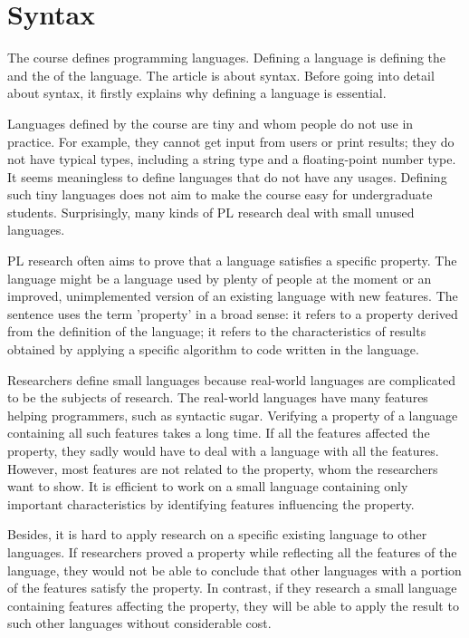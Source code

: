 \setchapterpreamble[u]{\margintoc}
\chapter{Syntax}

The course defines programming languages. Defining a language is defining the
 and the  of the language. The article is about
syntax. Before going into detail about syntax, it firstly explains why defining a
language is essential.

Languages defined by the course are tiny and whom people do not use in practice.
For example, they cannot get input from users or print results; they do not have
typical types, including a string type and a floating-point number type. It seems
meaningless to define languages that do not have any usages. Defining such tiny
languages does not aim to make the course easy for undergraduate students.
Surprisingly, many kinds of PL research deal with small unused languages.

PL research often aims to prove that a language satisfies a specific property.
The language might be a language used by plenty of people at the moment or an
improved, unimplemented version of an existing language with new features. The
sentence uses the term 'property' in a broad sense: it refers to a property
derived from the definition of the language; it refers to the characteristics of
results obtained by applying a specific algorithm to code written in the
language.

Researchers define small languages because real-world languages are complicated
to be the subjects of research. The real-world languages have many features
helping programmers, such as syntactic sugar. Verifying a property of a language
containing all such features takes a long time. If all the features affected the
property, they sadly would have to deal with a language with all the features.
However, most features are not related to the property, whom the researchers want
to show. It is efficient to work on a small language containing only important
characteristics by identifying features influencing the property.

Besides, it is hard to apply research on a specific existing language to other
languages. If researchers proved a property while reflecting all the features of
the language, they would not be able to conclude that other languages with a
portion of the features satisfy the property. In contrast, if they research a
small language containing features affecting the property, they will be able to
apply the result to such other languages without considerable cost.

